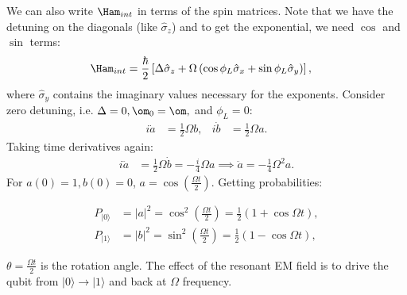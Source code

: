 \documentclass[a4paper, 11pt, normalem]{report}
\begin{document}
We can also write $\Ham_{int}$ in terms of the spin matrices.
Note that we have the detuning on the diagonals (like $\hat{\sigma}_z$) and to get the exponential, we need $\cos$ and $\sin$ terms:
\begin{align}
    \Ham_{int} &= \frac{\hbar}{2}\left[\Delta\hat{\sigma}_z + \Omega\left(\cos\phi_L\hat{\sigma}_x + \sin\phi_L\hat{\sigma}_y\right)\right],
\end{align}
where $\hat{\sigma}_y$ contains the imaginary values necessary for the exponents.
Consider zero detuning, i.e. $\Delta=0,\om_0=\om,$ and $\phi_L=0$:
\begin{align}
    i\dot{a} &= \frac12 \Omega b, & i\dot{b} &= \frac12\Omega a.
\end{align}
Taking time derivatives again:
\begin{align}
    i\ddot{a} &= \frac12\Omega\dot{b} = -\frac{i}{4}\Omega a \implies \ddot{a} = -\frac14\Omega^2 a.
\end{align}
For $a(0)=1,b(0)=0$, $a=\cos\left(\frac{\Omega t}{2}\right)$.
Getting probabilities:
\begin{figure}[H]
\begin{multicols}{2}
    \centering
    \columnbreak
    \vfill
    \begin{align}
        P_{|0\rangle} &= |a|^2 = \cos^2\left(\frac{\Omega t}{2}\right) = \frac12(1+\cos\Omega t), \\
        P_{|1\rangle} &= |b|^2 = \sin^2\left(\frac{\Omega t}{2}\right) = \frac12(1-\cos\Omega t),
    \end{align}
    \vfill
\end{multicols}
\vspace{-20pt}
\end{figure}
$\theta=\frac{\Omega t}{2}$ is the rotation angle.
The effect of the resonant EM field is to drive the qubit from $|0\rangle\to|1\rangle$ and back at $\Omega$ frequency.
\end{document}

